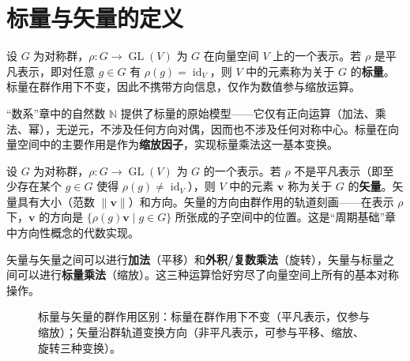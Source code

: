 \section{\texorpdfstring{标量与矢量的定义}{标量与矢量的定义}}

\begin{definition}[标量]\label{def:scalar}
设 $G$ 为对称群，$\rho: G \to \operatorname{GL}(V)$ 为 $G$ 在向量空间 $V$ 上的一个表示。若 $\rho$ 是平凡表示，即对任意 $g \in G$ 有 $\rho(g) = \operatorname{id}_V$，则 $V$ 中的元素称为关于 $G$ 的\textbf{标量}。标量在群作用下不变，因此不携带方向信息，仅作为数值参与缩放运算。

“数系”章中的自然数 $\mathbb{N}$ 提供了标量的原始模型——它仅有正向运算（加法、乘法、幂），无逆元，不涉及任何方向对偶，因而也不涉及任何对称中心。标量在向量空间中的主要作用是作为\textbf{缩放因子}，实现标量乘法这一基本变换。
\end{definition}

\begin{definition}[矢量]\label{def:vector}
设 $G$ 为对称群，$\rho: G \to \operatorname{GL}(V)$ 为 $G$ 的一个表示。若 $\rho$ 不是平凡表示（即至少存在某个 $g \in G$ 使得 $\rho(g) \neq \operatorname{id}_V$），则 $V$ 中的元素 $\mathbf{v}$ 称为关于 $G$ 的\textbf{矢量}。矢量具有大小（范数 $\|\mathbf{v}\|$）和方向。矢量的方向由群作用的轨道刻画——在表示 $\rho$ 下，$\mathbf{v}$ 的方向是 $\{\rho(g)\mathbf{v} \mid g \in G\}$ 所张成的子空间中的位置。这是“周期基础”章中方向性概念的代数实现。

矢量与矢量之间可以进行\textbf{加法}（平移）和\textbf{外积/复数乘法}（旋转），矢量与标量之间可以进行\textbf{标量乘法}（缩放）。这三种运算恰好穷尽了向量空间上所有的基本对称操作。
\end{definition}

\begin{figure}[htbp]
\centering
{}
\caption{标量与矢量的群作用区别：标量在群作用下不变（平凡表示，仅参与缩放）；矢量沿群轨道变换方向（非平凡表示，可参与平移、缩放、旋转三种变换）。}
\label{fig:scalar_vector_group_action}
\end{figure}

